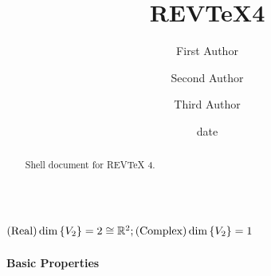 \documentclass[aps,preprint]{revtex4}%
\begin{document}
\title[Short title for running header]{REV\TeX4}
\author{First Author}
\author{Second Author}
\author{Third Author}

\begin{abstract}
Shell document for REV\TeX{} 4.

\end{abstract}
\date[Date text]{date}




\maketitle
\tableofcontents


\subsection{\bigskip$\left(  \text{Real}\right)  \dim\left\{  V_{2}\right\}
=2\protect\cong\mathbb{R}^{2};\left(  \text{Complex}\right)  \dim\left\{
V_{2}\right\}  =1$}

\paragraph{Basic Properties}
\end{document}
